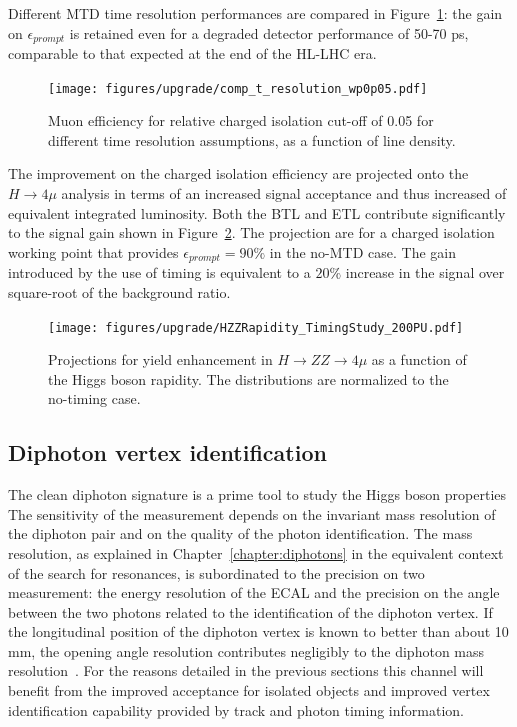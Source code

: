 Different MTD time resolution performances are compared in Figure~\ref{fig:muon_iso_res_comp}: the gain on $\epsilon_{prompt}$
is retained even for a degraded detector performance of 50-70 ps, comparable to that expected at the end of the HL-LHC era.

\begin{figure}[h!]
  \centering
  \texttt{[image: figures/upgrade/comp\_t\_resolution\_wp0p05.pdf]}
  \caption{Muon efficiency for relative charged isolation cut-off of 0.05 for different time resolution assumptions, as
    a function of line density.}
  \label{fig:muon_iso_res_comp}
\end{figure}

The improvement on the charged isolation efficiency are projected onto the $H \to 4\mu$ analysis in terms of
an increased signal acceptance and thus increased of equivalent integrated luminosity.
Both the BTL and ETL contribute significantly to the signal gain shown in Figure~\ref{fig:H_4mu_gain}. The
projection are for a charged isolation working point that provides $\epsilon_{prompt}= 90\%$ in the no-MTD case.
The gain introduced by the use of timing is equivalent to a $20\%$ increase in the signal over square-root of the background
ratio.

\begin{figure}
  \centering
  \texttt{[image: figures/upgrade/HZZRapidity\_TimingStudy\_200PU.pdf]}
  \caption{Projections for yield enhancement in $H\to ZZ\to 4\mu$ as a function of the Higgs boson rapidity.
    The distributions are normalized to the no-timing case.}
  \label{fig:H_4mu_gain}
\end{figure}

\subsection{Diphoton vertex identification}
The clean diphoton signature is a prime tool to study the Higgs boson properties
The sensitivity of the measurement depends on the invariant mass resolution of the diphoton pair
and on the quality of the photon identification.
The mass resolution, as explained in Chapter~\ref{chapter:diphotons} in the equivalent context of the search for resonances,
is subordinated to the precision on two measurement: the energy resolution of the ECAL and the precision on the
angle between the two photons related to the identification of the diphoton vertex.
If the longitudinal position of the diphoton vertex is known to better than about 10 mm, the opening angle
resolution contributes negligibly to the diphoton mass resolution~\cite{Khachatryan:2014ira}.
For the reasons detailed in the previous sections this channel will
benefit from the improved acceptance for isolated objects and improved vertex identification
capability provided by track and photon timing information.







